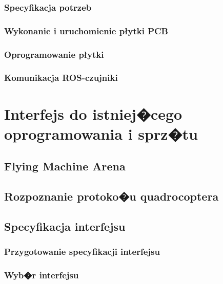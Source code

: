 \documentclass[12pt,a4paper,twoside,openright,fleqn]{mwrep}
\begin{document}
			\subsubsection{Specyfikacja potrzeb}
			
			\subsubsection{Wykonanie i uruchomienie płytki PCB}
			
			\subsubsection{Oprogramowanie płytki}
			
			\subsubsection{Komunikacja ROS-czujniki}
			

	\section{Interfejs do istniej�cego oprogramowania i sprz�tu}
	
		\subsection{Flying Machine Arena}
		
		\subsection{Rozpoznanie protoko�u quadrocoptera}
		
		\subsection{Specyfikacja interfejsu}
		
			\subsubsection{Przygotowanie specyfikacji interfejsu}
			
			\subsubsection{Wyb�r interfejsu}
			
\end{document}
